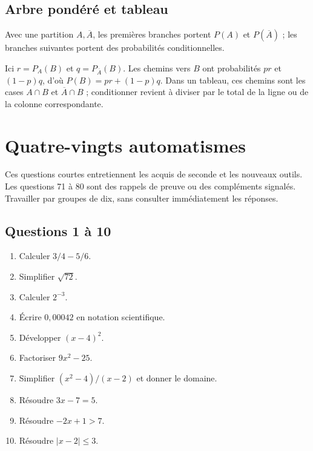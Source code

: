 \documentclass[11pt,a4paper,oneside]{book}
\begin{document}
\section{Arbre pondéré et tableau}
Avec une partition $A,\overline A$, les premières branches portent
$P(A)$ et $P(\overline A)$ ; les branches suivantes portent des
probabilités conditionnelles.
\begin{center}
\end{center}
Ici $r=P_A(B)$ et $q=P_{\overline A}(B)$.
Les chemins vers $B$ ont probabilités $pr$ et $(1-p)q$,
d'où $P(B)=pr+(1-p)q$. Dans un tableau, ces chemins sont les cases
$A\cap B$ et $\overline A\cap B$ ; conditionner revient à diviser par
le total de la ligne ou de la colonne correspondante.

\chapter{Quatre-vingts automatismes}
Ces questions courtes entretiennent les acquis de seconde et les nouveaux outils.
Les questions 71 à 80 sont des rappels de preuve ou des compléments signalés.
Travailler par groupes de dix, sans consulter immédiatement les réponses.
\section{Questions 1 à 10}
\begin{enumerate}[start=1]
\item Calculer $3/4-5/6$.
\item Simplifier $\sqrt{72}$.
\item Calculer $2^{-3}$.
\item Écrire $0{,}00042$ en notation scientifique.
\item Développer $(x-4)^2$.
\item Factoriser $9x^2-25$.
\item Simplifier $(x^2-4)/(x-2)$ et donner le domaine.
\item Résoudre $3x-7=5$.
\item Résoudre $-2x+1>7$.
\item Résoudre $|x-2|\le3$.
\end{enumerate}
\end{document}
